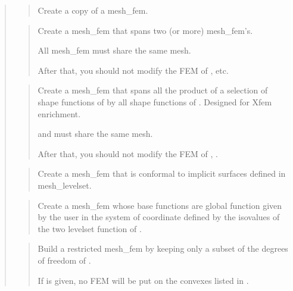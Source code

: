 \documentclass[a4paper,11pt,english]{sphinxmanual}
\begin{document}
\begin{quote}
\begin{quote}
\sphinxAtStartPar
Create a copy of a mesh\_fem.
\end{quote}

\sphinxAtStartPar
{}
\begin{quote}

\sphinxAtStartPar
Create a mesh\_fem that spans two (or more) mesh\_fem’s.

\sphinxAtStartPar
All mesh\_fem must share the same mesh.

\sphinxAtStartPar
After that, you should not modify the FEM of ,  etc.
\end{quote}

\sphinxAtStartPar
{}
\begin{quote}

\sphinxAtStartPar
Create a mesh\_fem that spans all the product of a selection of shape
functions of  by all shape functions of .
Designed for Xfem enrichment.

\sphinxAtStartPar
{} and  must share the same mesh.

\sphinxAtStartPar
After that, you should not modify the FEM of , .
\end{quote}

\sphinxAtStartPar
{}
\begin{quote}

\sphinxAtStartPar
Create a mesh\_fem that is conformal to implicit surfaces defined in
mesh\_levelset.
\end{quote}

\sphinxAtStartPar
{}
\begin{quote}

\sphinxAtStartPar
Create a mesh\_fem whose base functions are global function given by the
user in the system of coordinate defined by the iso\sphinxhyphen{}values of the two
level\sphinxhyphen{}set function of .
\end{quote}

\sphinxAtStartPar
{}
\begin{quote}

\sphinxAtStartPar
Build a restricted mesh\_fem by keeping only a subset of the degrees of
freedom of .

\sphinxAtStartPar
If  is given, no FEM will be put on the convexes listed in
.
\end{quote}
\end{quote}
\end{document}

